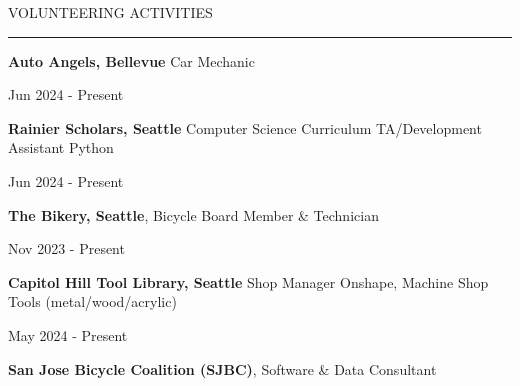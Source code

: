 
{
\hspace{-1.72in}\noindent\color{cblue}
{VOLUNTEERING ACTIVITIES} %
}

\vspace{-2.0ex}
{\hspace{-1.73in}\noindent\color{dblue}\rule{6.935in}{0.4pt}} %
\vspace{-2ex}


{\hspace{-1.73in}\small
\textbf{Auto Angels, Bellevue} Car Mechanic}

\vspace{-4.5ex}
\begin{subtitle}
    Jun 2024 - Present
\end{subtitle}
\vspace{-1.5ex}


{\hspace{-1.73in}\small
\textbf{Rainier Scholars, Seattle} Computer Science Curriculum TA/Development Assistant} {\color{cyan}\small Python}

\vspace{-4.5ex}
\begin{subtitle}
    Jun 2024 - Present
\end{subtitle}
\vspace{-1.5ex}

{\hspace{-1.73in}\small
\textbf{The Bikery, Seattle}, Bicycle Board Member \& Technician }

\vspace{-4.5ex}
\begin{subtitle}
    Nov 2023 - Present
\end{subtitle}
\vspace{-1.5ex}

{\hspace{-1.73in}\small
\textbf{Capitol Hill Tool Library, Seattle} Shop Manager}
{\color{cyan}\small Onshape, Machine Shop Tools (metal/wood/acrylic)}

\vspace{-4.5ex}
\begin{subtitle}
    May 2024 - Present
\end{subtitle}
\vspace{-1.5ex}


{\hspace{-1.73in}\small
\textbf{San Jose Bicycle Coalition (SJBC)}, Software \& Data Consultant }

